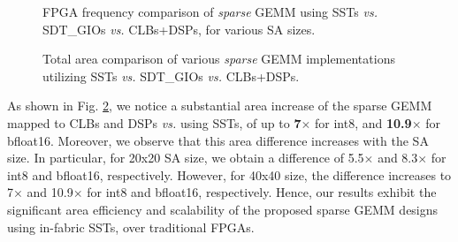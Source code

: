 \begin{figure}[t]
\vspace{-0.75cm}
\centering
{}
\hfill
{}
\label{fig:freq_SST_GIO_DSP_bf16}

\vspace{-0.3cm}

\caption{FPGA frequency comparison of \textit{sparse} GEMM using SSTs \emph{vs.} SDT\_GIOs \emph{vs.} CLBs+DSPs, for various SA sizes.}
\label{fig:freq_SST_vs_GIO_vs_DSP}
\vspace{-0.55cm}
\end{figure}


\begin{figure}[t]

\vspace{-0.25cm}

\centering
{}
\label{fig:area_SST_GIO_DSP_int8}
\hfill
{}
\label{fig:area_SST_GIO_DSP_bf16}

\vspace{-0.3cm}

\caption{Total area comparison of various \textit{sparse} GEMM implementations utilizing SSTs \emph{vs.} SDT\_GIOs \emph{vs.} CLBs+DSPs.}
\label{fig:area_SST_vs_GIO_vs_DSP}

\vspace{-0.55cm}

\end{figure}


As shown in Fig. \ref{fig:area_SST_vs_GIO_vs_DSP}, we notice a substantial area increase of the sparse GEMM mapped to CLBs and DSPs \emph{vs.} using SSTs, of up to \textbf{7$\times$} for int8, and \textbf{10.9$\times$} for bfloat16.
Moreover, we observe that this area difference increases with the SA size.
In particular, for 20x20 SA size, we obtain a difference of 5.5$\times$ and 8.3$\times$ for int8 and bfloat16, respectively.
However, for 40x40 size, the difference increases to 7$\times$ and 10.9$\times$ for int8 and bfloat16, respectively.
Hence, our results exhibit the significant area efficiency and scalability of the proposed sparse GEMM designs using in-fabric SSTs, 
over traditional FPGAs.




